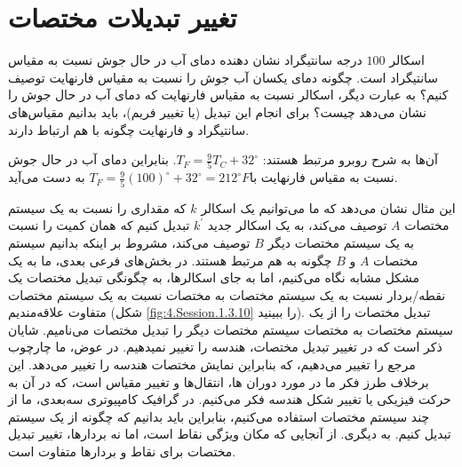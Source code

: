 \section{\textbf{تغییر تبدیلات مختصات}}
\label{sec:3.4}
{
    \Large
    \begin{spacing}{1.5}
        اسکالر $100$ درجه سانتیگراد نشان دهنده دمای آب در حال جوش نسبت به مقیاس سانتیگراد است.
        چگونه دمای یکسان آب جوش را نسبت به مقیاس فارنهایت توصیف کنیم؟ به عبارت دیگر، اسکالر نسبت به مقیاس فارنهایت که دمای آب در حال جوش را نشان می‌دهد چیست؟ برای انجام این تبدیل (یا تغییر فریم)، ​​باید بدانیم مقیاس‌های سانتیگراد و فارنهایت چگونه با هم ارتباط دارند.

        آن‌ها به شرح روبرو مرتبط هستند:
        $T_{F}=\frac{\displaystyle 9}{\displaystyle 5}T_{C}+32^\circ$. بنابراین دمای آب در حال جوش نسبت به مقیاس فارنهایت با$T_{F}=\frac{\displaystyle 9}{\displaystyle 5}(100)^\circ+32^\circ=212^\circ F$ به دست می‌آید.

        این مثال نشان می‌دهد که ما می‌توانیم یک اسکالر $k$ که مقداری را نسبت به یک سیستم مختصات $A$ توصیف می‌کند،
        به یک اسکالر جدید $k^\prime$ تبدیل کنیم که همان کمیت را نسبت به یک سیستم مختصات دیگر $B$ توصیف می‌کند،
        مشروط بر اینکه بدانیم سیستم مختصات $A$ و  $B$ چگونه به هم مرتبط هستند.
        در بخش‌های فرعی بعدی، ما به یک مشکل مشابه نگاه می‌کنیم، اما به جای اسکالرها، به چگونگی تبدیل مختصات یک نقطه/بردار نسبت به یک سیستم مختصات به مختصات نسبت به یک سیستم مختصات متفاوت علاقه‌مندیم (شکل \ref{fig:4.Session.1.3.10} را ببینید).
        تبدیل مختصات را از یک سیستم مختصات به مختصات سیستم مختصات دیگر را تبدیل مختصات می‌نامیم.
        شایان ذکر است که در تغییر تبدیل مختصات، هندسه را تغییر نمیدهیم. در عوض، ما چارچوب مرجع را تغییر می‌دهیم، که بنابراین نمایش مختصات هندسه را تغییر می‌دهد.
        این برخلاف طرز فکر ما در مورد دوران ها، انتقال‌ها و تغییر مقیاس است، که در آن به حرکت فیزیکی یا تغییر شکل هندسه فکر می‌کنیم.
        در گرافیک کامپیوتری سه‌بعدی، ما از چند سیستم مختصات استفاده می‌کنیم، بنابراین باید بدانیم که چگونه از یک سیستم تبدیل کنیم.
        به دیگری. از آنجایی که مکان ویژگی نقاط است، اما نه بردارها، تغییر تبدیل مختصات برای نقاط و بردارها متفاوت است.


\end{spacing}}
